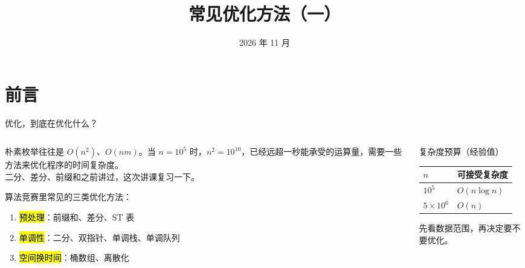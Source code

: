 \documentclass[aspectratio=169]{beamer}
\begin{document}
\title{常见优化方法（一）}
\date{2026 年 11 月}

\begin{frame}
    \titlepage
\end{frame}

\section{前言}

\begin{frame}{优化，到底在优化什么？}
    \begin{columns}[T]
        \begin{column}{0.54\textwidth}
            \small
            朴素枚举往往是 $O(n^2)$、$O(nm)$。当 $n=10^5$ 时，$n^2=10^{10}$，已经远超一秒能承受的运算量，需要一些方法来优化程序的时间复杂度。\\
            二分、差分、前缀和之前讲过，这次讲课复习一下。

            \vspace{0.6em}
            算法竞赛里常见的三类优化方法：
            \begin{enumerate}
                \item \hl{预处理}：前缀和、差分、ST 表
                \item \hl{单调性}：二分、双指针、单调栈、单调队列
                \item \hl{空间换时间}：桶数组、离散化
            \end{enumerate}
        \end{column}
        \begin{column}{0.42\textwidth}
            \begin{block}{复杂度预算（经验值）}
                \vspace{0.4em}
                \centering
                \footnotesize
                \begin{tabular}{ll}
                    \toprule
                    $n$ & 可接受复杂度 \\
                    \midrule
                    $10^5$ & $O(n\log n)$ \\
                    $5\times10^6$ & $O(n)$ \\
                    \bottomrule
                \end{tabular}
            \end{block}
            \vspace{0.4em}
            \footnotesize
            先看数据范围，再决定要不要优化。
        \end{column}
    \end{columns}
\end{frame}
\end{document}
